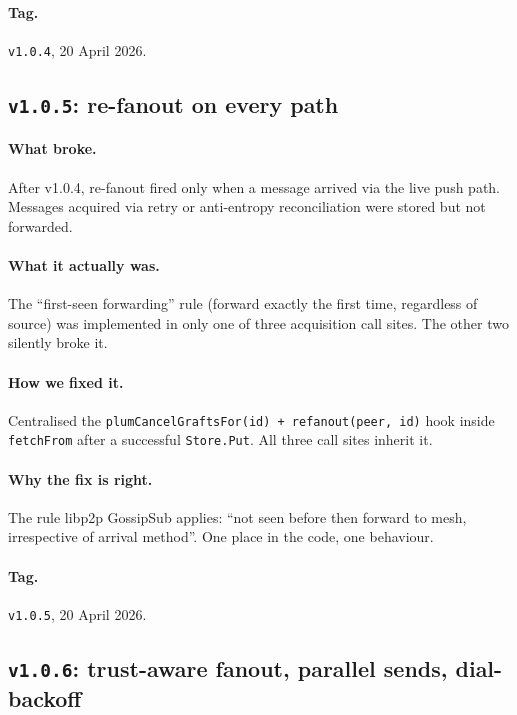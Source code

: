 \documentclass[11pt,a4paper]{article}
\begin{document}
\paragraph*{Tag.} \texttt{v1.0.4}, 20 April 2026.

\subsection{\texttt{v1.0.5}: re-fanout on every path}

\paragraph{What broke.} After v1.0.4, re-fanout fired only when
a message arrived via the live push path. Messages acquired via
retry or anti-entropy reconciliation were stored but not
forwarded.

\paragraph{What it actually was.} The ``first-seen forwarding''
rule (forward exactly the first time, regardless of source) was
implemented in only one of three acquisition call sites. The
other two silently broke it.

\paragraph{How we fixed it.} Centralised the
\texttt{plumCancelGraftsFor(id) + refanout(peer, id)} hook
inside \texttt{fetchFrom} after a successful \texttt{Store.Put}.
All three call sites inherit it.

\paragraph{Why the fix is right.} The rule libp2p GossipSub
applies: ``not seen before then forward to mesh, irrespective of
arrival method''. One place in the code, one behaviour.

\paragraph*{Tag.} \texttt{v1.0.5}, 20 April 2026.

\subsection{\texttt{v1.0.6}: trust-aware fanout, parallel sends,
dial-backoff}
\end{document}
